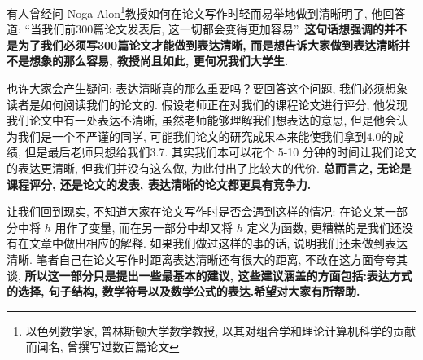 \documentclass{booki}
\begin{document}
有人曾经问 Noga Alon\footnote{以色列数学家, 普林斯顿大学数学教授, 以其对组合学和理论计算机科学的贡献而闻名, 曾撰写过数百篇论文}教授如何在论文写作时轻而易举地做到清晰明了, 他回答道: {``}当我们前300篇论文发表后, 这一切都会变得更加容易''\cite{pakhow}. \textbf{这句话想强调的并不是为了我们必须写300篇论文才能做到表达清晰, 而是想告诉大家做到表达清晰并不是想象的那么容易, 教授尚且如此, 更何况我们大学生.} \par
也许大家会产生疑问: 表达清晰真的那么重要吗？要回答这个问题, 我们必须想象读者是如何阅读我们的论文的. 假设老师正在对我们的课程论文进行评分, 他发现我们论文中有一处表达不清晰, 虽然老师能够理解我们想表达的意思, 但是他会认为我们是一个不严谨的同学, 可能我们论文的研究成果本来能使我们拿到4.0的成绩, 但是最后老师只想给我们3.7. 其实我们本可以花个 5-10 分钟的时间让我们论文的表达更清晰, 但我们并没有这么做, 为此付出了比较大的代价. \textbf{总而言之, 无论是课程评分, 还是论文的发表, 表达清晰的论文都更具有竞争力.} \par
让我们回到现实, 不知道大家在论文写作时是否会遇到这样的情况: 在论文某一部分中将 $h$ 用作了变量, 而在另一部分中却又将 $h$ 定义为函数, 更糟糕的是我们还没有在文章中做出相应的解释. 如果我们做过这样的事的话, 说明我们还未做到表达清晰. 笔者自己在论文写作时距离表达清晰还有很大的距离, 不敢在这方面夸夸其谈, \textbf{所以这一部分只是提出一些最基本的建议, {这些建议涵盖的方面包括:表达方式的选择, 句子结构, 数学符号以及数学公式的表达}.希望对大家有所帮助. }
\end{document}
